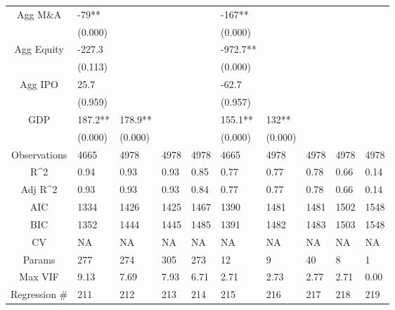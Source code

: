 \documentclass{article}
\begin{document}
\begin{table}[H]
\begin{tabular}{|clllllllll|}
  Agg M\&A & -79** &  &  &  & -167** &  &  &  &  \\ 
   & (0.000) &  &  &  & (0.000) &  &  &  &  \\ 
  Agg Equity & -227.3 &  &  &  & -972.7** &  &  &  &  \\ 
   & (0.113) &  &  &  & (0.000) &  &  &  &  \\ 
  Agg IPO & 25.7 &  &  &  & -62.7 &  &  &  &  \\ 
   & (0.959) &  &  &  & (0.957) &  &  &  &  \\ 
  GDP & 187.2** & 178.9** &  &  & 155.1** & 132** &  &  &  \\ 
   & (0.000) & (0.000) &  &  & (0.000) & (0.000) &  &  &  \\ 
  \hline 
 Observations & 4665 & 4978 & 4978 & 4978 & 4665 & 4978 & 4978 & 4978 & 4978 \\ 
  R^2 & 0.94 & 0.93 & 0.93 & 0.85 & 0.77 & 0.77 & 0.78 & 0.66 & 0.14 \\ 
  Adj R^2 & 0.93 & 0.93 & 0.93 & 0.84 & 0.77 & 0.77 & 0.78 & 0.66 & 0.14 \\ 
  AIC & 1334 & 1426 & 1425 & 1467 & 1390 & 1481 & 1481 & 1502 & 1548 \\ 
  BIC & 1352 & 1444 & 1445 & 1485 & 1391 & 1482 & 1483 & 1503 & 1548 \\ 
  CV & NA & NA & NA & NA & NA & NA & NA & NA & NA \\ 
  Params & 277 & 274 & 305 & 273 & 12 & 9 & 40 & 8 & 1 \\ 
  Max VIF & 9.13 & 7.69 & 7.93 & 6.71 & 2.71 & 2.73 & 2.77 & 2.71 & 0.00 \\ 
  Regression \# & 211 & 212 & 213 & 214 & 215 & 216 & 217 & 218 & 219 \\ 
   \hline
\end{tabular}
 
\end{table}
\end{document}

